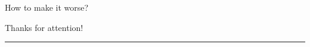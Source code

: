 \begin{frame}{How to make it worse?}

\end{frame}



\begin{frame}
\Large{{Thanks for attention!}}
\vspace{0.5cm}
\hrule
\vspace{3cm}
\end{frame}

\nologo



